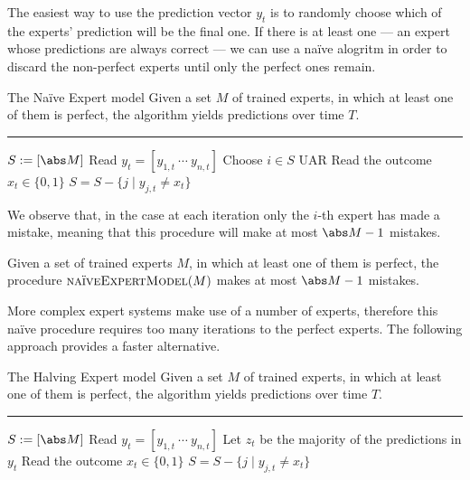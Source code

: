 \documentclass[a4paper, 12pt]{report}
\begin{document}
    The easiest way to use the prediction vector $y_t$ is to randomly choose which of the experts' prediction will be the final one. If there is at least one  --- an expert whose predictions are always correct --- we can use a naïve alogritm in order to discard the non-perfect experts until only the perfect ones remain.

    \begin{framedalgo}{The Naïve Expert model}
        Given a set $M$ of trained experts, in which at least one of them is perfect, the algorithm yields predictions over time $T$. \\
        \hrule

        \quad
        \begin{algorithmic}[1]
                \State $S := [\abs M]$
                    \State Read $y_t = [y_{1, t} \ \cdots \ y_{n, t}]$
                    \State Choose $i \in S$ UAR
                    \State Read the outcome $x_t \in \{0, 1\}$
                        \State $S = S - \{j \mid y_{j, t} \neq x_t\}$
                    \EndIf
                \EndFor
            \EndFunction
        \end{algorithmic}
    \end{framedalgo}

    We observe that, in the  case at each iteration only the $i$-th expert has made a mistake, meaning that this procedure will make at most $\abs M - 1$ mistakes.

    \begin{framedprop}{}
        Given a set of trained experts $M$, in which at least one of them is perfect, the procedure $\textsc{naïveExpertModel}(M)$ makes at most $\abs M - 1$ mistakes.
    \end{framedprop}

    More complex expert systems make use of a  number of experts, therefore this naïve procedure requires too many iterations to  the perfect experts. The following approach provides a faster alternative.

    \begin{framedalgo}{The Halving Expert model}
        Given a set $M$ of trained experts, in which at least one of them is perfect, the algorithm yields predictions over time $T$. \\
        \hrule

        \quad
        \begin{algorithmic}[1]
                \State $S := [\abs M]$
                    \State Read $y_t = [y_{1, t} \ \cdots \ y_{n, t}]$
                    \State Let $z_t$ be the majority of the predictions in $y_t$
                    \State Read the outcome $x_t \in \{0, 1\}$
                        \State $S = S - \{j \mid y_{j, t} \neq x_t\}$
                    \EndIf
                \EndFor
            \EndFunction
        \end{algorithmic}
    \end{framedalgo}
\end{document}
